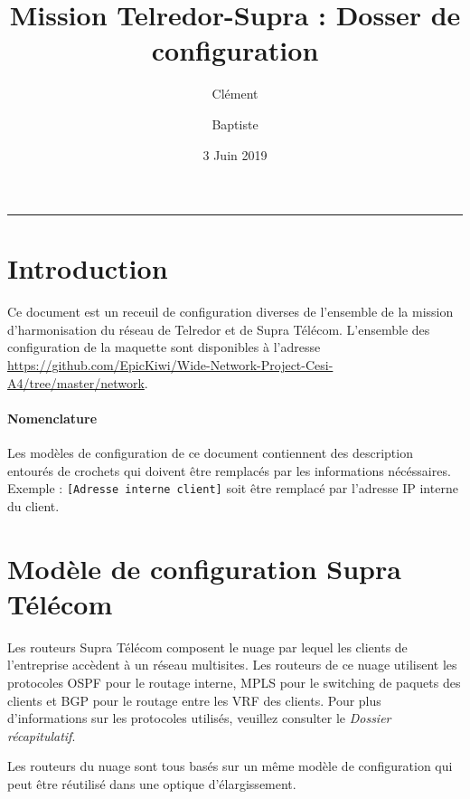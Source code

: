 \documentclass{article}
\title{Mission Telredor-Supra : Dosser de configuration}
\date{3 Juin 2019}
\author{Clément \bsc{Boutin} \and Baptiste \bsc{Saclier}}
\newcommand{\tlr}{Telredor\xspace}
\newcommand{\spr}{Supra Télécom\xspace}
\begin{document}
\maketitle

\begin{center}
\rule{0.5\textwidth}{0.4pt}
\end{center}

\tableofcontents

\section{Introduction}

Ce document est un receuil de configuration diverses de l'ensemble de la mission d'harmonisation du réseau de \tlr et de \spr.
L'ensemble des configuration de la maquette sont disponibles à l'adresse \url{https://github.com/EpicKiwi/Wide-Network-Project-Cesi-A4/tree/master/network}.

\paragraph{Nomenclature} Les modèles de configuration de ce document contiennent des description entourés de crochets qui doivent être remplacés par les informations nécéssaires.
Exemple : \texttt{\color{PineGreen}[Adresse interne client]} soit être remplacé par l'adresse IP interne du client.

\section{Modèle de configuration \spr}

Les routeurs \spr composent le nuage par lequel les clients de l'entreprise accèdent à un réseau multisites.
Les routeurs de ce nuage utilisent les protocoles OSPF pour le routage interne, MPLS pour le switching de paquets des clients et BGP pour le routage entre les VRF des clients.
Pour plus d'informations sur les protocoles utilisés, veuillez consulter le \emph{Dossier récapitulatif}.

Les routeurs du nuage sont tous basés sur un même modèle de configuration qui peut être réutilisé dans une optique d'élargissement.
\end{document}

